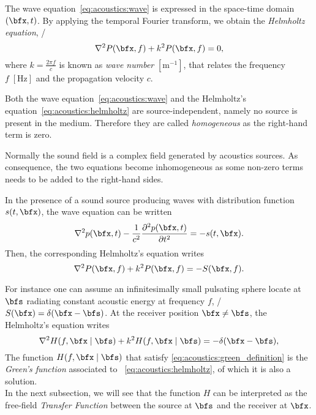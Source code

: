 The wave equation~\ref{eq:acoustics:wave} is expressed in the space-time domain $\depSpaceTime$.
By applying the temporal Fourier transform, we obtain the \textit{Helmholtz equation}, \ie/
\begin{equation}
    \label{eq:acoustics:helmholtz}
    \knabla^2 P(\positionMicrophone, f) + k^2 P(\positionMicrophone, f) = 0
    ,
\end{equation}
where $k = \frac{2 \pi f}{c}$  is known as \textit{wave number} $[\si{\metre^{-1}}]$, that relates the frequency $f \; [\si{\hertz}]$ and the propagation velocity $c$.

Both the wave equation~\ref{eq:acoustics:wave} and the Helmholtz's equation~\ref{eq:acoustics:helmholtz} are source-independent,
namely no source is present in the medium.
Therefore they are called \textit{homogeneous} as the right-hand term is zero.

Normally the sound field is a complex field generated by acoustics sources.
As consequence, the two equations become inhomogeneous as some non-zero terms needs to be added to the right-hand sides.

In the presence of a sound source producing waves with distribution function $s(t, \positionMicrophone)$, the wave equation can be written
\begin{equation}
    \label{eq:acoustics:source}
    \knabla^2 \pressureSpaceTime - \frac{1}{\speedOfSound^2} \kpderiv[2]{\pressureSpaceTime}{t} = -s(t, \positionMicrophone)
    .
\end{equation}
Then, the corresponding Helmholtz's equation writes
\begin{equation}
    \label{eq:acoustics:source_freq}
    \knabla^2 P(\positionMicrophone, f) + k^2 P(\positionMicrophone, f) = - S(\positionMicrophone, f)
    .
\end{equation}

For instance one can assume an infinitesimally small pulsating sphere locate at $\positionSource$ radiating constant acoustic energy at frequency $f$,
\ie/ $S(\positionMicrophone) = \delta(\positionMicrophone - \positionSource)$.
At the receiver position $\positionMicrophone \neq \positionSource$, the Helmholtz's equation writes
\begin{equation}
    \label{eq:acoustics:green_definition}
    \knabla^2 H(f, \positionMicrophone \mid \positionSource)
     + k^2 H(f, \positionMicrophone \mid \positionSource) = - \delta(\positionMicrophone - \positionSource)
    ,
\end{equation}
The function $H(f, \positionMicrophone \mid \positionSource)$ that satisfy \cref{eq:acoustics:green_definition} is the \textit{Green's function}
associated to ~\cref{eq:acoustics:helmholtz}, of which it is also a solution.
\\In the next subsection, we will see that the function $H$ can be interpreted as the free-field \textit{Transfer Function}
between the source at $\positionSource$ and the receiver at $\positionMicrophone$.

